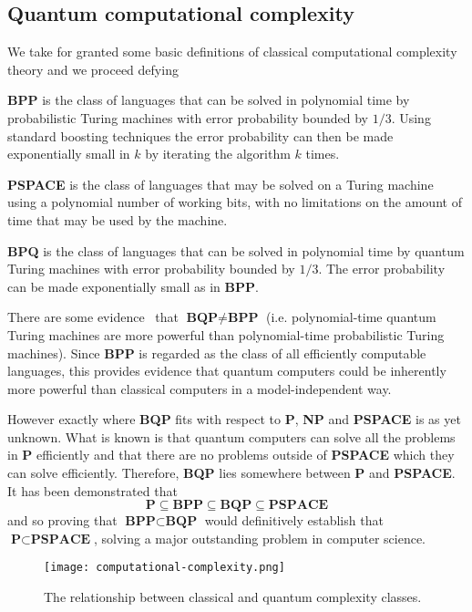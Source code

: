 \subsection{Quantum computational complexity}
We take for granted some basic definitions of classical computational complexity theory and we proceed defying
\begin{defn}
\textbf{BPP} is the class of languages that can be solved in polynomial time by probabilistic Turing machines with error probability bounded by $1/3$. Using standard boosting techniques the error probability can then be made exponentially small in $k$ by iterating the algorithm $k$ times.
\end{defn}
\begin{defn}
\textbf{PSPACE} is the class of languages that may be solved on a Turing machine using a polynomial number of working bits, with no limitations on the amount of time that may be used by the machine.
\end{defn}
\begin{defn}
\textbf{BPQ} is the class of languages that can be solved in polynomial time by quantum Turing machines with error probability bounded by $1/3$. The error probability can be made exponentially small as in \textbf{BPP}.
\end{defn}
There are some evidence~\cite{Bennett_1997} that $\textbf{BQP} \neq \textbf{BPP}$ (i.e. polynomial-time quantum Turing machines are more powerful than polynomial-time probabilistic Turing machines). Since \textbf{BPP} is regarded as the class of all efficiently computable languages, this provides evidence that quantum computers could be inherently more powerful than classical computers in a model-independent way.

However exactly where \textbf{BQP} fits with respect to \textbf{P}, \textbf{NP} and \textbf{PSPACE} is as yet unknown. What is known is that quantum computers can solve all the problems in \textbf{P} efficiently and that there are no problems outside of \textbf{PSPACE} which they can solve efficiently. Therefore, \textbf{BQP} lies somewhere between \textbf{P} and \textbf{PSPACE}.
It has been demonstrated that
\begin{equation*}
   \textbf{P}   \subseteq \textbf{BPP} \subseteq \textbf{BQP}  \subseteq \textbf{PSPACE}
\end{equation*}
and so proving that $\textbf{BPP} \subset \textbf{BQP}$ would definitively establish that $\textbf{P} \subset \textbf{PSPACE}$, solving a major outstanding problem in computer science.
\begin{figure}[htb]
\texttt{[image: computational-complexity.png]}
\centering
\caption{The relationship between classical and quantum complexity classes.}
\end{figure}

